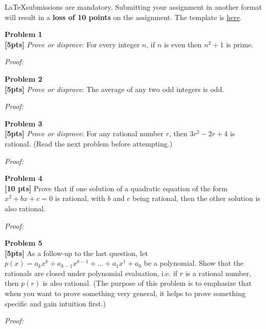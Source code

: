 \documentclass{article}
\newenvironment{problem}[2][Problem]
    { \begin{mdframed}[backgroundcolor=gray!20] \textbf{#1 #2} \\}
    {  \end{mdframed}}
\newenvironment{solution}
    {\textit{Proof:}}
    {}
\begin{document}
\begin{mdframed}[backgroundcolor=blue!20]
\LaTeX submissions are mandatory. Submitting your assignment in another format will result in a \textbf{loss of 10 points} on the assignment. The template is \href{https://www.overleaf.com/read/cxzsjxxwhvgg}{here}.
\end{mdframed}

\begin{problem}{1}
\textbf{[5pts]} \textit{Prove or disprove}: For every integer $n$, if $n$ is even then $n^2 + 1$ is prime. 
\end{problem}
\begin{solution}
\end{solution}

\begin{problem}{2}
\textbf{[5pts]} \textit{Prove or disprove}: The average of any two odd integers is odd. 
\end{problem}
\begin{solution}
\end{solution}

\begin{problem}{3}
\textbf{[5pts]} \textit{Prove or disprove}: For any rational number $r$, then $3r^2 - 2r + 4$ is rational. (Read the next problem before attempting.)
\end{problem}
\begin{solution}
\end{solution}

\begin{problem}{4}
\textbf{[10 pts]} Prove that if one solution of a quadratic equation of the form $x^2 + bx + c = 0$ is rational, with $b$ and $c$ being rational, then the other solution is also rational.
\end{problem}
\begin{solution}
\end{solution}

\begin{problem}{5}
\textbf{[5pts]} As a follow-up to the last question, let $p(x) = a_k x^k + a_{k-1} x^{k-1} + \ldots + a_1 x^1 + a_0$ be a polynomial. Show that the rationals are closed under polynomial evaluation, i.e. if $r$ is a rational number, then $p(r)$ is also rational. (The purpose of this problem is to emphasize that when you want to prove something very general, it helps to prove something specific and gain intuition first.)
\end{problem}
\begin{solution}
\end{solution}
\end{document}
